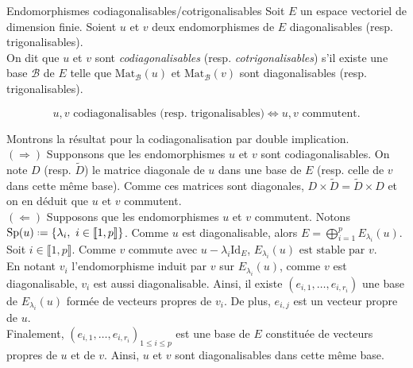\begin{defi}{Endomorphismes codiagonalisables/cotrigonalisables}
    Soit $E$ un espace vectoriel de dimension finie. Soient $u$ et $v$ deux endomorphismes de $E$ diagonalisables (resp. trigonalisables). \\
    On dit que $u$ et $v$ sont \emph{codiagonalisables} (resp. \emph{cotrigonalisables}) s'il existe une base $\mathscr{B}$ de $E$ telle que $\mathrm{Mat}_\mathscr{B}(u)$ et $\mathrm{Mat}_\mathscr{B}(v)$ sont diagonalisables (resp. trigonalisables). 
\end{defi}

\begin{prop}
    $$u, v \text{ codiagonalisables (resp. trigonalisables)} \Longleftrightarrow u, v \text{ commutent}.$$
\end{prop}

\begin{preuve} 
    Montrons la résultat pour la codiagonalisation par double implication. \\
    $(\Rightarrow)$ Supponsons que les endomorphismes $u$ et $v$ sont codiagonalisables. On note $D$ (resp. $\widetilde{D}$) le matrice diagonale de $u$ dans une base de $E$ (resp. celle de $v$ dans cette même base). Comme ces matrices sont diagonales, $D \times \widetilde{D} = \widetilde{D} \times D$ et on en déduit que $u$ et $v$ commutent. \\
    $(\Leftarrow)$ Supposons que les endomorphismes $u$ et $v$ commutent. Notons $\mathrm{Sp}(u) \defeq \{ \lambda_i,\ i \in \llbracket1, p \rrbracket \}$. Comme $u$ est diagonalisable, alors $E = \bigoplus\limits_{i = 1}^{p} E_{\lambda_i}(u)$. \\
    Soit $i \in \llbracket 1, p \rrbracket$. Comme $v$ commute avec $u - \lambda_i \mathrm{Id}_E$, $E_{\lambda_i}(u) \text{ est stable par } v$. \\
    En notant $v_i$ l'endomorphisme induit par $v$ sur $E_{\lambda_i}(u)$, comme $v$ est diagonalisable, $v_i$ est aussi diagonalisable. Ainsi, il existe $(e_{i, 1}, \dots, e_{i, r_i})$ une base de $E_{\lambda_i}(u)$ formée de vecteurs propres de $v_i$. De plus, $e_{i, j}$ est un vecteur propre de $u$. \\
    Finalement, $(e_{i, 1}, \dots, e_{i, r_i})_{1 \leqslant i \leqslant p}$ est une base de $E$ constituée de vecteurs propres de $u$ et de $v$. Ainsi, $u$ et $v$ sont diagonalisables dans cette même base. 
\end{preuve}


\marginnote[0cm]{
    \begin{kaobox}[frametitle=Endomorphisme induit]
    \end{kaobox}
}